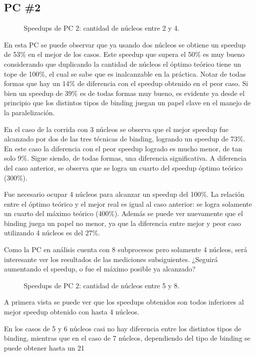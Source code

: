 \documentclass{article}
\begin{document}
\subsection{PC \#2}
\begin{figure}[h!]
    
    \caption{Speedups de PC 2: cantidad de núcleos entre 2 y 4.}
\end{figure}
En esta PC se puede observar que ya usando dos núcleos se obtiene un speedup de 53\% en el mejor de los casos. Este speedup que supera el 50\% es muy bueno considerando que duplicando la cantidad de núcleos el óptimo teórico tiene un tope de 100\%, el cual se sabe que es inalcanzable en la práctica. Notar de todas formas que hay un 14\% de diferencia con el speedup obtenido en el peor caso. Si bien un speedup de 39\% es de todas formas muy bueno, es evidente ya desde el principio que los distintos tipos de binding juegan un papel clave en el manejo de la paralelización. 

En el caso de la corrida con 3 núcleos se observa que el mejor speedup fue alcanzado por dos de las tres técnicas de binding, logrando un speedup de 73\%. En este caso la diferencia con el peor speedup logrado es mucho menor, de tan solo 9\%. Sigue siendo, de todas formas, una diferencia significativa. A diferencia del caso anterior, se observa que se logra un cuarto del speedup óptimo teórico (300\%).

Fue necesario ocupar 4 núcleos para alcanzar un speedup del 100\%. La relación entre el óptimo teórico y el mejor real es igual al caso anterior: se logra solamente un cuarto del máximo teórico (400\%). Además se puede ver nuevamente que el binding juega un papel no menor, ya que la diferencia entre mejor y peor caso utilizando 4 núcleos es del 27\%. 

Como la PC en análisis cuenta con 8 subprocesos pero solamente 4 núcleos, será interesante ver los resultados de las mediciones subsiguientes. ¿Seguirá aumentando el speedup, o fue el máximo posible ya alcanzado?

\begin{figure}[h!]
    
    \caption{Speedups de PC 2: cantidad de núcleos entre 5 y 8.}
\end{figure}
A primera vista se puede ver que los speedups obtenidos son todos inferiores al mejor speedup obtenido con hasta 4 núcleos.

En los casos de 5 y 6 núcleos casi no hay diferencia entre los distintos tipos de binding, mientras que en el caso de 7 núcleos, dependiendo del tipo de binding se puede obtener hasta un 21%
\end{document}
